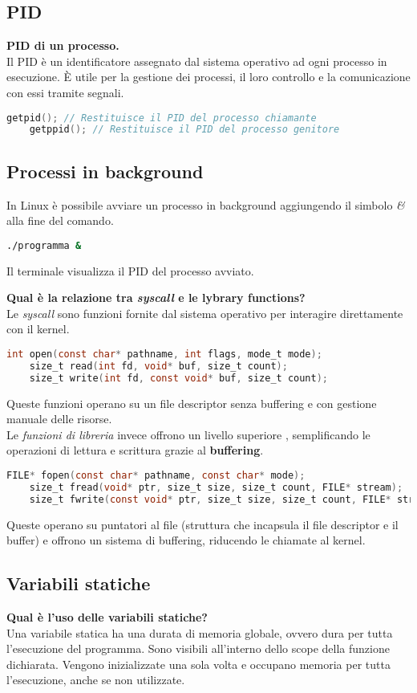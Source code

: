 \subsection{PID}
\textbf{PID di un processo.}\\
Il PID è un identificatore assegnato dal sistema operativo ad ogni processo in esecuzione. È utile per la gestione dei processi, il loro controllo e la comunicazione con essi tramite segnali.
\begin{lstlisting}[language=C]
	getpid(); // Restituisce il PID del processo chiamante
	getppid(); // Restituisce il PID del processo genitore
\end{lstlisting}

\subsection{Processi in background}
In Linux è possibile avviare un processo in background aggiungendo il simbolo \textit{\&} alla fine del comando.
\begin{lstlisting}[language=BASH]
	./programma &
\end{lstlisting}
Il terminale visualizza il PID del processo avviato.

\textbf{Qual è la relazione tra \textit{syscall} e le lybrary functions?}\\
Le \textit{syscall} sono funzioni fornite dal sistema operativo per interagire direttamente con il kernel.
\begin{lstlisting}[language=C]
	int open(const char* pathname, int flags, mode_t mode);
	size_t read(int fd, void* buf, size_t count);
	size_t write(int fd, const void* buf, size_t count);
\end{lstlisting}
Queste funzioni operano su un file descriptor senza buffering e con gestione manuale delle risorse.\\
Le \textit{funzioni di libreria} invece offrono un livello superiore , semplificando le operazioni di lettura e scrittura grazie al \textbf{buffering}.
\begin{lstlisting}[language=C]
	FILE* fopen(const char* pathname, const char* mode);
	size_t fread(void* ptr, size_t size, size_t count, FILE* stream);
	size_t fwrite(const void* ptr, size_t size, size_t count, FILE* stream);
\end{lstlisting}
Queste operano su puntatori al file (struttura che incapsula il file descriptor e il buffer) e offrono un sistema di buffering, riducendo le chiamate al kernel.

\subsection{Variabili statiche}
\textbf{Qual è l'uso delle variabili statiche?}\\
Una variabile statica ha una durata di memoria globale, ovvero dura per tutta l'esecuzione del programma. Sono visibili all'interno dello scope della funzione dichiarata. Vengono inizializzate una sola volta e occupano memoria per tutta l'esecuzione, anche se non utilizzate.

